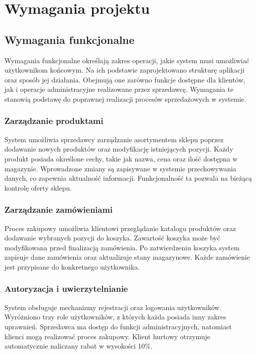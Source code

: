 \documentclass[a4paper,12pt]{report}
\begin{document}
\chapter{Wymagania projektu}

\section{Wymagania funkcjonalne}
Wymagania funkcjonalne określają zakres operacji, jakie system musi umożliwiać użytkownikom końcowym. Na ich podstawie zaprojektowano strukturę aplikacji oraz sposób jej działania. Obejmują one zarówno funkcje dostępne dla klientów, jak i operacje administracyjne realizowane przez sprzedawcę. Wymagania te stanowią podstawę do poprawnej realizacji procesów sprzedażowych w systemie.

\subsection{Zarządzanie produktami}
System umożliwia sprzedawcy zarządzanie asortymentem sklepu poprzez dodawanie nowych produktów oraz modyfikację istniejących pozycji. Każdy produkt posiada określone cechy, takie jak nazwa, cena oraz ilość dostępna w magazynie. Wprowadzone zmiany są zapisywane w systemie przechowywania danych, co zapewnia aktualność informacji. Funkcjonalność ta pozwala na bieżącą kontrolę oferty sklepu.

\subsection{Zarządzanie zamówieniami}
Proces zakupowy umożliwia klientowi przeglądanie katalogu produktów oraz dodawanie wybranych pozycji do koszyka. Zawartość koszyka może być modyfikowana przed finalizacją zamówienia. Po zatwierdzeniu koszyka system zapisuje dane zamówienia oraz aktualizuje stany magazynowe. Każde zamówienie jest przypisane do konkretnego użytkownika.

\subsection{Autoryzacja i uwierzytelnianie}
System obsługuje mechanizmy rejestracji oraz logowania użytkowników. Wyróżniono trzy role użytkowników, z których każda posiada inny zakres uprawnień. Sprzedawca ma dostęp do funkcji administracyjnych, natomiast klienci mogą realizować proces zakupowy. Klient hurtowy otrzymuje automatycznie naliczany rabat w wysokości 10\%.
\end{document}
